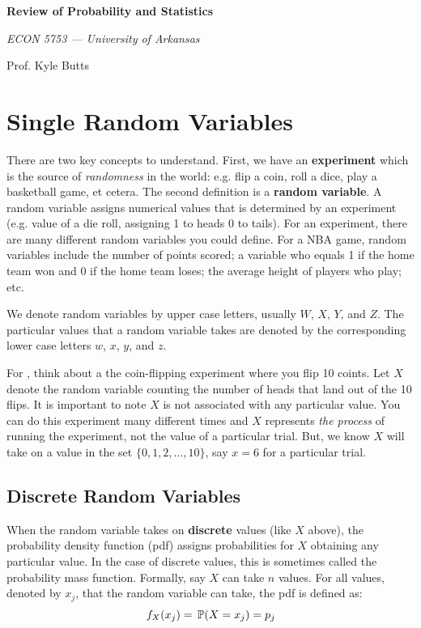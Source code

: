 \documentclass[12pt]{article}
\begin{document}
\begin{center}
  {\Huge\bf Review of Probability and Statistics}
  
  \smallskip
  {\large\it ECON 5753 — University of Arkansas}

  \medskip
  {\large Prof. Kyle Butts}
\end{center}

\section{Single Random Variables}

There are two key concepts to understand. First, we have an \textbf{experiment} which is the source of \emph{randomness} in the world: e.g. flip a coin, roll a dice, play a basketball game, et cetera. The second definition is a \textbf{random variable}. A random variable assigns numerical values that is determined by an experiment (e.g. value of a die roll, assigning 1 to heads 0 to tails). For an experiment, there are many different random variables you could define. For a NBA game, random variables include the number of points scored; a variable who equals 1 if the home team won and 0 if the home team loses; the average height of players who play; etc. 

We denote random variables by upper case letters, usually $W$, $X$, $Y$,
and $Z$. The particular values that a random variable takes are denoted by the corresponding lower case letters $w$, $x$, $y$, and $z$.

For , think about a the coin-flipping experiment where you flip 10 coints. Let $X$ denote the random variable counting the number of heads that land out of the 10 flips. It is important to note $X$ is not associated with any particular value. You can do this experiment many different times and $X$ represents \emph{the process} of running the experiment, not the value of a particular trial. But, we know $X$ will take on a value in the set $\{ 0, 1, 2, \dots, 10 \}$, say $x = 6$ for a particular trial.


\subsection*{Discrete Random Variables}

When the random variable takes on \textbf{discrete} values (like $X$ above), the probability density function (pdf) assigns probabilities for $X$ obtaining any particular value. In the case of discrete values, this is sometimes called the probability mass function. Formally, say $X$ can take $n$ values. For all values, denoted by $x_j$, that the random variable can take, the pdf is defined as:
$$
  f_{X}(x_j) = \P{X = x_j} = p_j
$$
\end{document}
